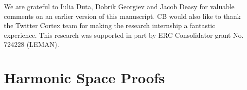 \documentclass{article}
\begin{document}
\newpage
\begin{ack}

We are grateful to Iulia Duta, Dobrik Georgiev and Jacob Deasy for valuable comments on an earlier version of this manuscript. CB would also like to thank the Twitter Cortex team for making the research internship a fantastic experience. This research was supported in part by ERC Consolidator grant No. 724228 (LEMAN). 

\end{ack}










































\newpage
\appendix

\section{Harmonic Space Proofs}
\end{document}
